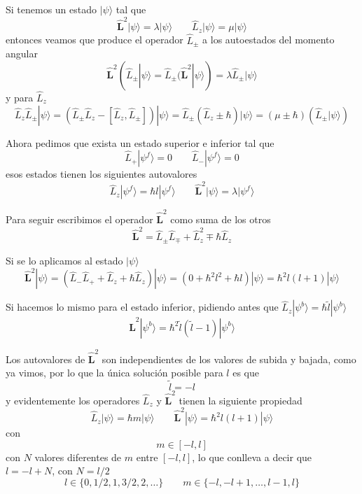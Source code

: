 \documentclass{book}
\numberwithin{equation}{section} %
\begin{document}
Si tenemos un estado $|\psi\rangle$ tal que
\begin{equation}
    \hat{\boldsymbol{L}}^2 |\psi\rangle = \lambda |\psi\rangle \qquad \hat{L}_z |\psi\rangle = \mu |\psi\rangle
\end{equation}
entonces veamos que produce el operador $\hat{L}_\pm$ a los autoestados del momento angular
\[\hat{\boldsymbol{L}}^2 (\hat{L}_\pm |\psi\rangle = \hat{L}_\pm (\hat{\boldsymbol{L}}^2 |\psi\rangle) = \lambda \hat{L}_\pm |\psi\rangle \]
y para $\hat{L}_z$
\[\hat{L}_z \hat{L}_\pm |\psi\rangle = (\hat{L}_\pm \hat{L}_z - [\hat{L}_z, \hat{L}_\pm]) |\psi\rangle = \hat{L}_\pm (\hat{L}_z \pm \hbar) |\psi\rangle = (\mu \pm \hbar) (\hat{L}_\pm |\psi\rangle) \]

Ahora pedimos que exista un estado superior e inferior tal que
\[ \hat{L}_+ |\psi^f\rangle = 0 \qquad \hat{L}_- |\psi^f\rangle = 0 \]
esos estados tienen los siguientes autovalores
\[ \hat{L}_z |\psi^f\rangle = \hbar l |\psi^f\rangle \qquad \hat{\boldsymbol{L}}^2 |\psi\rangle = \lambda |\psi^f\rangle \]

Para seguir escribimos el operador $\hat{\boldsymbol{L}}^2$ como suma de los otros
\begin{equation}
    \hat{\boldsymbol{L}}^2 = \hat{L}_\pm \hat{L}_\mp + \hat{L}^2_z \mp \hbar \hat{L}_z
\end{equation}

Si se lo aplicamos al estado $|\psi \rangle$ 
\[ \hat{\boldsymbol{L}}^2 |\psi\rangle = (\hat{L}_- \hat{L}_+ + \hat{L}_z + \hbar \hat{L}_z) |\psi\rangle = (0 + \hbar^2 l^2 + \hbar l)|\psi\rangle = \hbar^2 l(l + 1) |\psi\rangle \]

Si hacemos lo mismo para el estado inferior, pidiendo antes que $\hat{L}_z |\psi^b\rangle = \hbar \tilde{l} |\psi^b\rangle$
\[ \hat{\boldsymbol{L}}^2 |\psi^b\rangle = \hbar^2 \tilde{l} (\tilde{l} - 1) |\psi^b\rangle\]

Los autovalores de $\hat{\boldsymbol{L}}^2$ son independientes de los valores de subida y bajada, como ya vimos, por lo que la única solución posible para $l$ es que
\[ \tilde{l} = - l \]
y evidentemente los operadores $\hat{L}_z$ y $\hat{\boldsymbol{L}}^2$ tienen la siguiente propiedad
\begin{equation}
    \hat{L}_z |\psi\rangle = \hbar m |\psi\rangle \qquad \hat{\boldsymbol{L}}^2 |\psi\rangle = \hbar^2 l( l + 1) |\psi\rangle
\end{equation}
con
\begin{equation}
    m \in [-l, l]
\end{equation}
con $N$ valores diferentes de $m$ entre $[-l, l]$, lo que conlleva a decir que $l = -l + N$, con $N = l/2$
\begin{equation}
    l \in \{0, 1/2, 1, 3/2, 2, \dots\} \qquad m \in \{ -l, -l + 1, \dots, l - 1, l\}
\end{equation}
\end{document}
